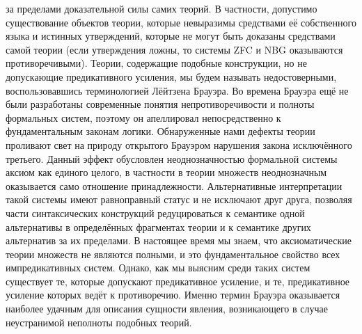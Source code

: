 \documentclass[12pt]{article}
\begin{document}
за пределами доказательной силы самих теорий. В частности, допустимо существование объектов теории, которые невыразимы средствами её собственного языка и истинных утверждений, которые не могут быть доказаны средствами самой теории (если утверждения ложны, то системы ZFC и NBG оказываются противоречивыми). Теории, содержащие подобные конструкции, но не допускающие предикативного усиления, мы будем называть недостоверными, воспользовавшись терминологией Лёйтзена Брауэра. Во времена Брауэра ещё не были разработаны современные понятия непротиворечивости и полноты формальных систем, поэтому он апеллировал непосредственно к фундаментальным законам логики. Обнаруженные нами дефекты теории проливают свет на природу открытого Брауэром нарушения закона исключённого третьего. Данный эффект обусловлен неоднозначностью формальной системы аксиом как единого целого, в частности в теории множеств неоднозначным оказывается само отношение принадлежности. Альтернативные интерпретации такой системы имеют равноправный статус и не исключают друг друга, позволяя части синтаксических конструкций редуцироваться к семантике одной альтернативы в определённых фрагментах теории и к семантике других альтернатив за их пределами. В настоящее время мы знаем, что аксиоматические теории множеств не являются полными, и это фундаментальное свойство всех импредикативных систем. Однако, как мы выясним среди таких систем существует те, которые допускают предикативное усиление, и те, предикативное усиление которых ведёт к противоречию. Именно термин Брауэра оказывается наиболее удачным для описания сущности явления, возникающего в случае неустранимой неполноты подобных теорий.
\end{document}
